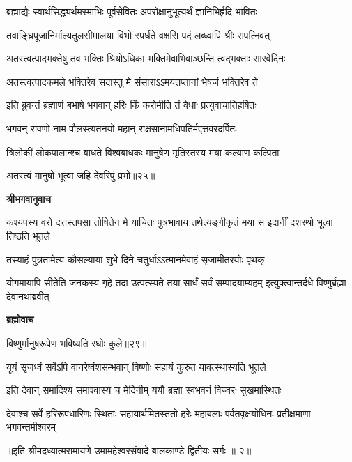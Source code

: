 \twolineshloka
{ब्रह्माद्यैः स्वार्थसिद्ध्यर्थमस्माभिः पूर्वसेवितः}
{अपरोक्षानुभूत्यर्थं ज्ञानिभिर्हृदि भावितः} %

\twolineshloka
{तवाङ्घ्रिपूजानिर्माल्यतुलसीमालया विभो}
{स्पर्धते वक्षसि पदं लब्ध्वापि श्रीः सपत्निवत्} %

\twolineshloka
{अतस्त्वत्पादभक्तेषु तव भक्तिः श्रियोऽधिका}
{भक्तिमेवाभिवाञ्छन्ति त्वद्भक्ताः सारवेदिनः} %

\twolineshloka
{अतस्त्वत्पादकमले भक्तिरेव सदास्तु मे}
{संसाराऽऽमयतप्तानां भेषजं भक्तिरेव ते} %

\twolineshloka
{इति ब्रुवन्तं ब्रह्माणं बभाषे भगवान् हरिः}
{किं करोमीति तं वेधाः प्रत्युवाचातिहर्षितः} %

\twolineshloka
{भगवन् रावणो नाम पौलस्त्यतनयो महान्}
{राक्षसानामधिपतिर्मद्दत्तवरदर्पितः} %

\twolineshloka
{त्रिलोकीं लोकपालान्श्च बाधते विश्वबाधकः}
{मानुषेण मृतिस्तस्य मया कल्याण कल्पिता} %

{अतस्त्वं मानुषो भूत्वा जहि देवरिपुं प्रभो॥२५॥} %


\textbf{श्रीभगवानुवाच}

\threelineshloka
{कश्यपस्य वरो दत्तस्तपसा तोषितेन मे}
{याचितः पुत्रभावाय तथेत्यङ्गीकृतं मया}
{स इदानीं दशरथो भूत्वा तिष्ठति भूतले} %

\twolineshloka
{तस्याहं पुत्रतामेत्य कौसल्यायां शुभे दिने}
{चतुर्धाऽऽत्मानमेवाहं सृजामीतरयोः पृथक्} %

\threelineshloka
{योगमायापि सीतेति जनकस्य गृहे तदा}
{उत्पत्स्यते तया सार्धं सर्वं सम्पादयाम्यहम्}
{इत्युक्त्वान्तर्दधे विष्णुर्ब्रह्मा देवानथाब्रवीत्} %

\textbf{ब्रह्मोवाच}

{विष्णुर्मानुषरूपेण भविष्यति रघोः कुले॥२९॥} %


\twolineshloka
{यूयं सृजध्वं सर्वेऽपि वानरेष्वंशसम्भवान्}
{विष्णोः सहायं कुरुत यावत्स्थास्यति भूतले} %

\twolineshloka
{इति देवान् समादिश्य समाश्वास्य च मेदिनीम्}
{ययौ ब्रह्मा स्वभवनं विज्वरः सुखमास्थितः} %

\fourlineindentedshloka
{देवाश्च सर्वे हरिरूपधारिणः}
{स्थिताः सहायार्थमितस्ततो हरेः}
{महाबलाः पर्वतवृक्षयोधिनः}
{प्रतीक्षमाणा भगवन्तमीश्वरम्} %

{॥इति श्रीमदध्यात्मरामायणे उमामहेश्वरसंवादे
बालकाण्डे द्वितीयः सर्गः ॥ २॥
}




